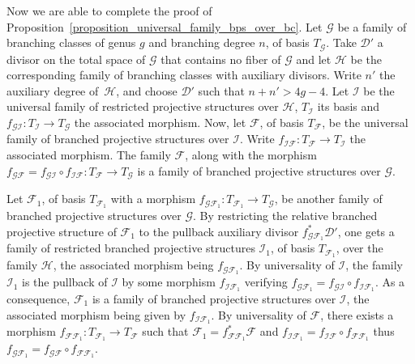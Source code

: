 \documentclass[10pt]{amsart}
\theoremstyle{definition}
\theoremstyle{plain}
\begin{document}
Now we are able to complete the proof of Proposition~\ref{proposition_universal_family_bps_over_bc}.
Let $\mathcal G$ be a family of branching classes of genus $g$ and branching degree $n$, of basis $T_{\mathcal G}$.
Take $\mathcal D'$ a divisor on the total space of $\mathcal G$ that contains no fiber of $\mathcal G$ and let $\mathcal H$ be the corresponding family of branching classes with auxiliary divisors.
Write $n'$ the auxiliary degree of~$\mathcal H$, and choose $\mathcal D'$ such that $n+n' > 4g-4$.
Let $\mathcal I$ be the universal family of restricted projective structures over $\mathcal H$, $T_{\mathcal I}$ its basis and $f_{\mathcal G \mathcal I}: T_{\mathcal I} \to T_{\mathcal G}$ the associated morphism.
Now, let $\mathcal F$, of basis $T_{\mathcal F}$, be the universal family of branched projective structures over $\mathcal I$.
Write $f_{\mathcal I \mathcal F}: T_{\mathcal F} \to T_{\mathcal I}$ the associated morphism.
The family $\mathcal F$, along with the morphism $f_{\mathcal G \mathcal F} = f_{\mathcal G \mathcal I} \circ f_{\mathcal I \mathcal F}: T_{\mathcal F} \to T_{\mathcal G}$ is a family of branched projective structures over $\mathcal G$.

Let $\mathcal F_1$, of basis $T_{\mathcal F_1}$ with a morphism $f_{\mathcal G \mathcal F_1}: T_{\mathcal F_1} \to T_{\mathcal G}$, be another family of branched projective structures over $\mathcal G$.
By restricting the relative branched projective structure of $\mathcal F_1$ to the pullback auxiliary divisor $f_{\mathcal G \mathcal F_1}^* \mathcal D'$, one gets a family of restricted branched projective structures $\mathcal I_1$, of basis $T_{\mathcal F_1}$, over the family $\mathcal H$, the associated morphism being $f_{\mathcal G \mathcal F_1}$.
By universality of $\mathcal I$, the family $\mathcal I_1$ is the pullback of $\mathcal I$ by some morphism $f_{\mathcal I \mathcal F_1}$ verifying $f_{\mathcal G \mathcal F_1} = f_{\mathcal G \mathcal I} \circ f_{\mathcal I \mathcal F_1}$.
As a consequence, $\mathcal F_1$ is a family of branched projective structures over $\mathcal I$, the associated morphism being given by $f_{\mathcal I \mathcal F_1}$.
By universality of $\mathcal F$, there exists a morphism $f_{\mathcal F \mathcal F_1}: T_{\mathcal F_1} \to T_{\mathcal F}$ such that $\mathcal F_1 = f_{\mathcal F \mathcal F_1}^* \mathcal F$ and $f_{\mathcal I \mathcal F_1} = f_{\mathcal I \mathcal F} \circ f_{\mathcal F \mathcal F_1}$ thus $f_{\mathcal G \mathcal F_1} = f_{\mathcal G \mathcal F} \circ f_{\mathcal F \mathcal F_1}$.
\end{document}
